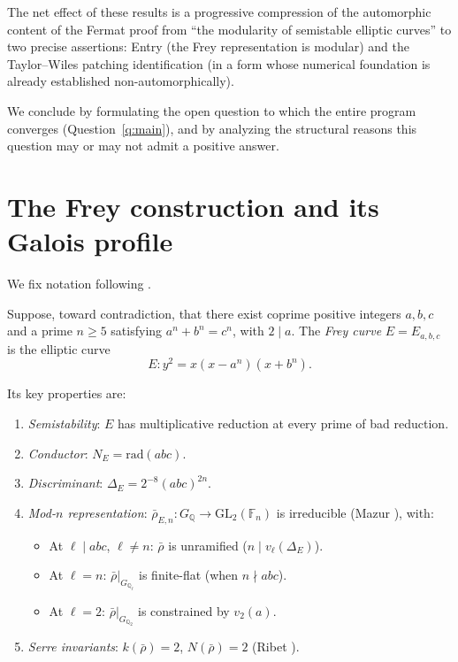 \documentclass[12pt]{amsart}
\theoremstyle{definition}
\theoremstyle{remark}
\newcommand{\GL}{\mathrm{GL}}
\newcommand{\rhobar}{\bar{\rho}}
\newcommand{\GQ}{G_{\mathbb{Q}}}
\newcommand{\GQl}{G_{\mathbb{Q}_\ell}}
\begin{document}
The net effect of these results is a progressive compression of the automorphic content of the Fermat proof from ``the modularity of semistable elliptic curves'' to two precise assertions: Entry (the Frey representation is modular) and the Taylor--Wiles patching identification (in a form whose numerical foundation is already established non-automorphically).

We conclude by formulating the open question to which the entire program converges (Question~\ref{q:main}), and by analyzing the structural reasons this question may or may not admit a positive answer.

\section{The Frey construction and its Galois profile}
\label{sec:frey}

We fix notation following \cite{DDT, Ribet90, Serre87}.

Suppose, toward contradiction, that there exist coprime positive integers $a, b, c$ and a prime $n \geq 5$ satisfying $a^n + b^n = c^n$, with $2 \mid a$. The \emph{Frey curve} $E = E_{a,b,c}$ is the elliptic curve
\begin{equation}\label{eq:frey}
E : y^2 = x(x - a^n)(x + b^n).
\end{equation}

Its key properties are:
\begin{enumerate}[label=(\alph*)]
\item \emph{Semistability}: $E$ has multiplicative reduction at every prime of bad reduction.
\item \emph{Conductor}: $N_E = \mathrm{rad}(abc)$.
\item \emph{Discriminant}: $\Delta_E = 2^{-8}(abc)^{2n}$.
\item \emph{Mod-$n$ representation}: $\rhobar_{E,n} : \GQ \to \GL_2(\mathbb{F}_n)$ is irreducible (Mazur \cite{Mazur}), with:
\begin{itemize}
\item At $\ell \mid abc$, $\ell \neq n$: $\rhobar$ is unramified ($n \mid v_\ell(\Delta_E)$).
\item At $\ell = n$: $\rhobar|_{\GQl}$ is finite-flat (when $n \nmid abc$).
\item At $\ell = 2$: $\rhobar|_{G_{\mathbb{Q}_2}}$ is constrained by $v_2(a)$.
\end{itemize}
\item \emph{Serre invariants}: $k(\rhobar) = 2$, $N(\rhobar) = 2$ (Ribet \cite{Ribet90}).
\end{enumerate}
\end{document}

